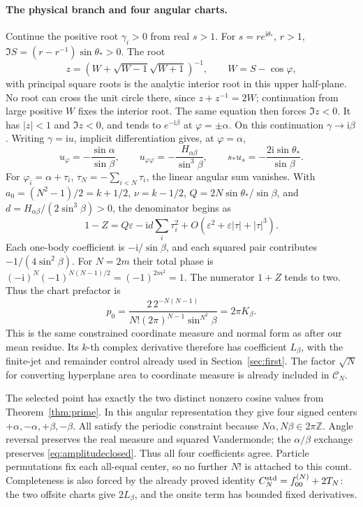 \documentclass[11pt]{article}
\numberwithin{equation}{section}
\theoremstyle{definition}
\newcommand{\ii}{\mathrm i}
\newcommand{\Z}{\mathbb Z}
\newcommand{\eps}{\varepsilon}
\begin{document}
\paragraph{The physical branch and four angular charts.}
Continue the positive root \(\gamma_i>0\) from real \(s>1\).
For \(s=r e^{\ii\theta_*}\), \(r>1\),
\(\Im S=(r-r^{-1})\sin\theta_*>0\). The root
\[
 z=(W+\sqrt{W-1}\sqrt{W+1})^{-1},\qquad W=S-\cos\varphi,
\]
with principal square roots is the analytic interior root in this
upper half-plane. No root can cross the unit circle there, since
\(z+z^{-1}=2W\); continuation from large positive \(W\) fixes
the interior root. The same equation then forces \(\Im z<0\).
It has \(|z|<1\) and \(\Im z<0\), and tends to
\(e^{-\ii\beta}\) at \(\varphi=\pm\alpha\).
On this continuation \(\gamma\to\ii\beta\).
Writing \(\gamma=\ii u\), implicit differentiation gives, at
\(\varphi=\alpha\),
\[
 u_\varphi=-\frac{\sin\alpha}{\sin\beta},\qquad
 u_{\varphi\varphi}=-\frac{H_{\alpha\beta}}{\sin^3\beta},\qquad
 s_*u_s=-\frac{2\ii\sin\theta_*}{\sin\beta}.
\]
For \(\varphi_i=\alpha+\tau_i\),
\(\tau_N=-\sum_{i<N}\tau_i\), the linear angular sum vanishes.
With \(a_0=(N^2-1)/2=k+1/2\), \(\nu=k-1/2\),
\(Q=2N\sin\theta_*/\sin\beta\), and
\(d=H_{\alpha\beta}/(2\sin^3\beta)>0\), the denominator begins as
\[
 1-Z=Q\eps-\ii d\sum_i\tau_i^2
       +O(\eps^2+\eps|\tau|+|\tau|^3).
\]
Each one-body coefficient is \(-\ii/\sin\beta\), and each
squared pair contributes \(-1/(4\sin^2\beta)\).
For \(N=2m\) their total phase is
\((-\ii)^N(-1)^{N(N-1)/2}=(-1)^{2m^2}=1\).
The numerator \(1+Z\) tends to two. Thus the chart prefactor is
\[
 p_0=\frac{2\,2^{-N(N-1)}}{N!(2\pi)^{N-1}\sin^{N^2}\beta}
     =2\pi K_\beta.
\]
This is the same constrained coordinate measure and normal form
as after our mean residue. Its \(k\)-th complex derivative
therefore has coefficient \(L_\beta\), with the finite-jet and
remainder control already used in Section~\ref{sec:first}.
The factor \(\sqrt N\) for converting hyperplane area to coordinate
measure is already included in \(\mathscr C_N\).

The selected point has exactly the two distinct nonzero cosine
values from Theorem~\ref{thm:prime}. In this angular representation
they give four signed centers \(+\alpha,-\alpha,+\beta,-\beta\).
All satisfy the periodic constraint because \(N\alpha,N\beta\in2\pi\Z\).
Angle reversal preserves the real measure and squared Vandermonde;
the \(\alpha/\beta\) exchange preserves \eqref{eq:amplitudeclosed}.
Thus all four coefficients agree. Particle permutations fix each
all-equal center, so no further \(N!\) is attached to this count.
Completeness is also forced by the already proved identity
\(C_N^{\rm std}=f_{00}^{(N)}+2T_N\): the two offsite charts give
\(2L_\beta\), and the onsite term has bounded fixed derivatives.
\end{document}
